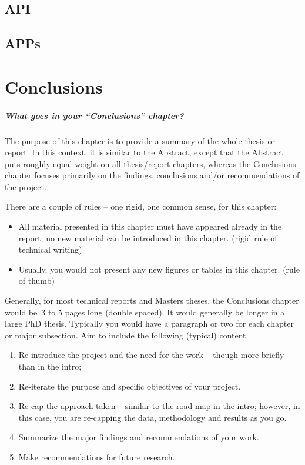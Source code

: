 \documentclass{swfcthesis}
\begin{document}
\section{API}
\label{sec:API}


\section{APPs}
\label{sec:apps}




\chapter{Conclusions}%


\paragraph{What goes in your ``Conclusions'' chapter?}

{ The purpose of this chapter is to provide a summary of the
  whole thesis or report.  In this context, it is similar to the Abstract, except that the
  Abstract puts roughly equal weight on all thesis/report chapters, whereas the
  Conclusions chapter focuses primarily on the findings, conclusions and/or
  recommendations of the project.

  There are a couple of rules – one rigid, one common sense, for this chapter:
  \begin{itemize}
  \item All material presented in this chapter must have appeared already in the report;
    no new material can be introduced in this chapter. (rigid rule of technical writing)
  \item Usually, you would not present any new figures or tables in this chapter. (rule of thumb)
  \end{itemize}

  Generally, for most technical reports and Masters theses, the Conclusions chapter would
  be~3 to 5 pages long (double spaced).  It would generally be longer in a large PhD
  thesis. Typically you would have a paragraph or two for each chapter or major
  subsection.  Aim to include the following (typical) content.
  \begin{enumerate}
  \item Re-introduce the project and the need for the work – though more briefly than in
    the intro;
  \item Re-iterate the purpose and specific objectives of your project.
  \item Re-cap the approach taken – similar to the road map in the intro; however, in this
    case, you are re-capping the data, methodology and results as you go.
  \item Summarize the major findings and recommendations of your work.
  \item Make recommendations for future research.
  \end{enumerate}}
\end{document}

